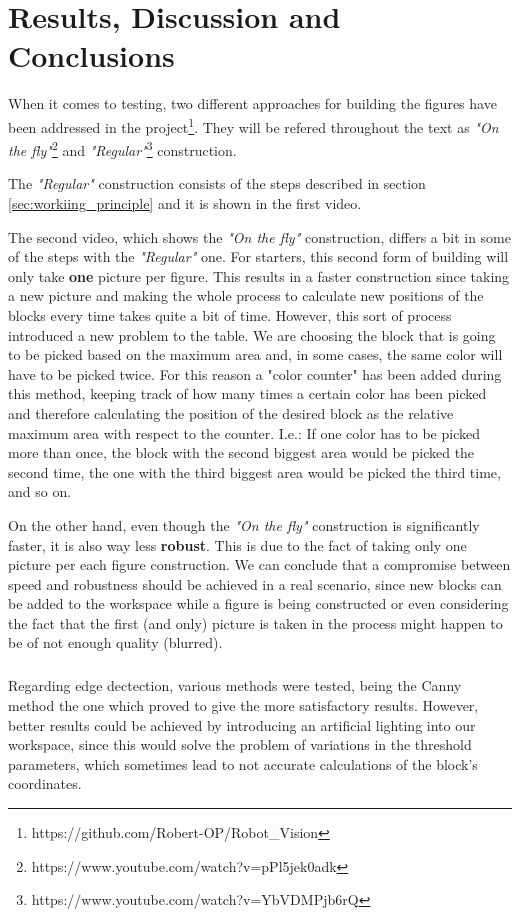 \chapter{Results, Discussion and Conclusions}\label{ch:conclusion}

When it comes to testing, two different approaches for building the figures have been addressed in the project\footnote{https://github.com/Robert-OP/Robot\_Vision}. They will be refered throughout the text as \textit{"On the fly"}\footnote{https://www.youtube.com/watch?v=pPl5jek0adk} and \textit{"Regular"}\footnote{https://www.youtube.com/watch?v=YbVDMPjb6rQ} construction.

The \textit{"Regular"} construction consists of the steps described in section \ref{sec:workiing_principle} and it is shown in the first video. 

The second video, which shows the \textit{"On the fly"} construction, differs a bit in some of the steps with the \textit{"Regular"} one.
For starters, this second form of building will only take \textbf{one} picture per figure. This results in a faster construction since taking a new picture and making the whole process to calculate new positions of the blocks every time takes quite a bit of time.
However, this sort of process introduced a new problem to the table. We are choosing the block that is going to be picked based on the maximum area and, in some cases, the same color will have to be picked twice.
For this reason a "color counter" has been added during this method, keeping track of how many times a certain color has been picked and therefore calculating the position of the desired block as the relative maximum area with respect to the counter. I.e.: If one color has to be picked more than once, the block with the second biggest area would be picked the second time, the one with the third biggest area would be picked the third time, and so on. 

On the other hand, even though the \textit{"On the fly"} construction is significantly faster, it is also way less \textbf{robust}. This is due to the fact of taking only one picture per each figure construction. 
We can conclude that a compromise between speed and robustness should be achieved in a real scenario, since new blocks can be added to the workspace while a figure is being constructed or even considering the fact that the first (and only) picture is taken in the process might happen to be of not enough quality (blurred).

\paragraph{} Regarding edge dectection, various methods were tested, being the Canny method the one which proved to give the more satisfactory results. 
However, better results could be achieved by introducing an artificial lighting into our workspace, since this would solve the problem of variations in the threshold parameters, which sometimes lead to not accurate calculations of the block's coordinates.

